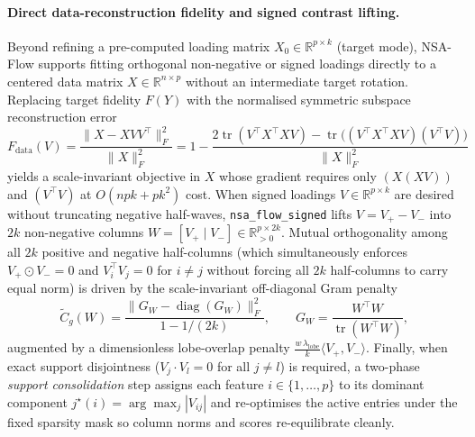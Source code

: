 \documentclass[11pt]{article}
\theoremstyle{definition}
\DeclareMathOperator{\tr}{tr}
\newcommand{\R}{\mathbb{R}}
\newcommand{\Rpos}{\R_{>0}}
\newcommand{\Fnorm}[1]{\lVert #1 \rVert_F}
\newcommand{\ip}[2]{\langle #1, #2 \rangle}
\begin{document}
\paragraph{Direct data-reconstruction fidelity and signed contrast lifting.}
Beyond refining a pre-computed loading matrix $X_0 \in \R^{p \times k}$ (target
mode), NSA-Flow supports fitting orthogonal non-negative or signed loadings
directly to a centered data matrix $X \in \R^{n \times p}$ without an
intermediate target rotation. Replacing target fidelity $F(Y)$ with the
normalised symmetric subspace reconstruction error
\begin{equation}\label{eq:fdata}
  F_{\text{data}}(V) = \frac{\Fnorm{X - X V V^\top}^2}{\Fnorm{X}^2}
  = 1 - \frac{2\tr(V^\top X^\top X V) - \tr\!\big((V^\top X^\top X V)(V^\top V)\big)}{\Fnorm{X}^2}
\end{equation}
yields a scale-invariant objective in $X$ whose gradient requires only
$(X(XV))$ and $(V^\top V)$ at $O(npk + pk^2)$ cost. When signed loadings
$V \in \R^{p \times k}$ are desired without truncating negative half-waves,
\texttt{nsa\_flow\_signed} lifts $V = V_+ - V_-$ into $2k$ non-negative columns
$W = [V_+ \mid V_-] \in \Rpos^{p \times 2k}$. Mutual orthogonality among all
$2k$ positive and negative half-columns (which simultaneously enforces
$V_+ \odot V_- = 0$ and $V_i^\top V_j = 0$ for $i \ne j$ without forcing all
$2k$ half-columns to carry equal norm) is driven by the scale-invariant
off-diagonal Gram penalty
\begin{equation}\label{eq:signed}
  \tilde C_g(W) = \frac{\Fnorm{G_W - \operatorname{diag}(G_W)}^2}{1 - 1/(2k)},
  \qquad G_W = \frac{W^\top W}{\tr(W^\top W)},
\end{equation}
augmented by a dimensionless lobe-overlap penalty
$\frac{w\,\lambda_{\text{lobe}}}{k}\ip{V_+}{V_-}$. Finally, when exact support
disjointness ($V_j \cdot V_l = 0$ for all $j \ne l$) is required, a two-phase
\emph{support consolidation} step assigns each feature $i \in \{1,\dots,p\}$ to
its dominant component $j^\star(i) = \arg\max_j |V_{ij}|$ and re-optimises the
active entries under the fixed sparsity mask so column norms and scores
re-equilibrate cleanly.
\end{document}

